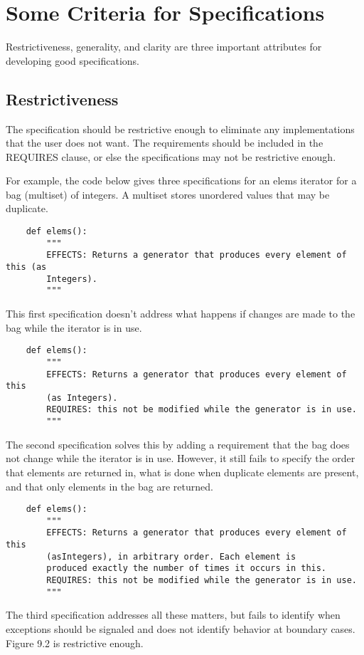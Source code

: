 \documentclass[oneside,11pt,dvipsnames]{book}
\begin{document}
\section{Some Criteria for Specifications}
Restrictiveness, generality, and clarity are three important attributes for developing good specifications.

\subsection{Restrictiveness}
The specification should be restrictive enough to eliminate any implementations that the user does not want. The requirements should be included in the REQUIRES clause, or else the specifications may not be restrictive enough.

For example, the code below gives three specifications for an elems iterator for a bag (multiset) of integers. A multiset stores unordered values that may be duplicate.

\begin{lstlisting}
    def elems():
        """
        EFFECTS: Returns a generator that produces every element of this (as 
        Integers).
        """
\end{lstlisting}
This first specification doesn’t address what happens if changes are made to the bag while the iterator is in use.
\begin{lstlisting}
    def elems():
        """
        EFFECTS: Returns a generator that produces every element of this
        (as Integers).
        REQUIRES: this not be modified while the generator is in use.
        """
\end{lstlisting}
The second specification solves this by adding a requirement that the bag does not change while the iterator is in use. However, it still fails to specify the order that elements are returned in, what is done when duplicate elements are present, and that only elements in the bag are returned.
\begin{lstlisting}
    def elems():
        """
        EFFECTS: Returns a generator that produces every element of this
        (asIntegers), in arbitrary order. Each element is
        produced exactly the number of times it occurs in this.
        REQUIRES: this not be modified while the generator is in use.
        """

\end{lstlisting}
The third specification addresses all these matters, but fails to identify when exceptions should be signaled and does not identify behavior at boundary cases. Figure 9.2 is restrictive enough.
\end{document}
